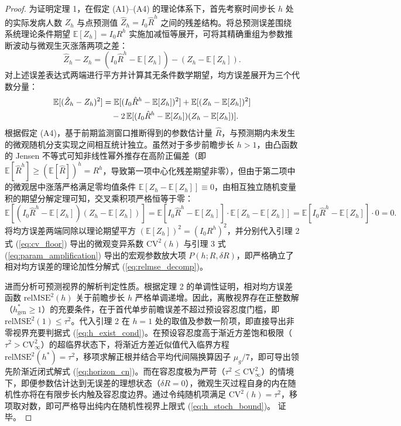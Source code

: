 \documentclass[11pt,a4paper]{article}
\theoremstyle{plain}
\theoremstyle{definition}
\begin{document}
\begin{proof}
为证明定理 1，在假定 (A1)--(A4) 的理论体系下，首先考察时间步长 $h$ 处的实际发病人数 $Z_h$ 与点预测值 $\hat{Z}_h = I_0 \hat{R}^h$ 之间的残差结构。将总预测误差围绕系统理论条件期望 $\mathbb{E}[Z_h] = I_0 R^h$ 实施加减恒等展开，可将其精确重组为参数推断波动与微观生灭涨落两项之差：
\begin{equation}
\hat{Z}_h - Z_h = (I_0 \hat{R}^h - \mathbb{E}[Z_h]) - (Z_h - \mathbb{E}[Z_h]).
\end{equation}
对上述误差表达式两端进行平方并计算其无条件数学期望，均方误差展开为三个代数分量：
\begin{align}
\mathbb{E}[(\hat{Z}_h - Z_h)^2] &= \mathbb{E}[(I_0 \hat{R}^h - \mathbb{E}[Z_h])^2] + \mathbb{E}[(Z_h - \mathbb{E}[Z_h])^2] \notag \\
&\quad - 2\,\mathbb{E}[(I_0 \hat{R}^h - \mathbb{E}[Z_h])(Z_h - \mathbb{E}[Z_h])].
\end{align}
根据假定 (A4)，基于前期监测窗口推断得到的参数估计量 $\hat{R}$，与预测期内未发生的微观随机分支实现之间相互统计独立。虽然对于多步前瞻步长 $h > 1$，由凸函数的 Jensen 不等式可知非线性幂外推存在高阶正偏差（即 $\mathbb{E}[\hat{R}^h] \ge (\mathbb{E}[\hat{R}])^h = R^h$，导致第一项中心化残差期望非零），但由于第二项中的微观居中涨落严格满足零均值条件 $\mathbb{E}[Z_h - \mathbb{E}[Z_h]] \equiv 0$，由相互独立随机变量积的期望分解定理可知，交叉乘积项严格恒等于零：
\begin{equation}
\mathbb{E}[(I_0 \hat{R}^h - \mathbb{E}[Z_h])(Z_h - \mathbb{E}[Z_h])] = \mathbb{E}[I_0 \hat{R}^h - \mathbb{E}[Z_h]] \cdot \mathbb{E}[Z_h - \mathbb{E}[Z_h]] = \mathbb{E}[I_0 \hat{R}^h - \mathbb{E}[Z_h]] \cdot 0 = 0.
\end{equation}
将均方误差两端同除以理论期望平方 $(\mathbb{E}[Z_h])^2 = (I_0 R^h)^2$，并分别代入引理 2 式 (\ref{eq:cv_floor}) 导出的微观变异系数 $\text{CV}^2(h)$ 与引理 3 式 (\ref{eq:param_amplification}) 导出的宏观参数放大项 $P(h; R, \delta R)$，即严格确立了相对均方误差的理论加性分解式 (\ref{eq:relmse_decomp})。

进而分析可预测视界的解析判定性质。根据定理 2 的单调性证明，相对均方误差函数 $\text{relMSE}^2(h)$ 关于前瞻步长 $h$ 严格单调递增。因此，离散视界存在正整数解（$h^*_{\text{gen}} \ge 1$）的充要条件，在于首代单步前瞻误差不超过预设容忍度门槛，即 $\text{relMSE}^2(1) \le \tau^2$。代入引理 2 在 $h=1$ 处的取值及参数一阶项，即直接导出非零视界充要判据式 (\ref{eq:h_exist_cond})。在预设容忍度高于渐近方差饱和极限（$\tau^2 > \text{CV}^2_\infty$）的超临界状态下，将渐近方差近似值代入临界方程 $\text{relMSE}^2(h^*) = \tau^2$，移项求解正根并结合平均代间隔换算因子 $\mu_g/7$，即可导出领先阶渐近闭式解式 (\ref{eq:horizon_cn})。而在容忍度极为严苛（$\tau^2 \le \text{CV}^2_\infty$）的情境下，即便参数估计达到无误差的理想状态（$\delta R = 0$），微观生灭过程自身的内在随机性亦将在有限步长内触及容忍度边界。通过令纯随机项满足 $\text{CV}^2(h) = \tau^2$，移项取对数，即可严格导出纯内在随机性视界上限式 (\ref{eq:h_stoch_bound})。
证毕。
\end{proof}
\end{document}
